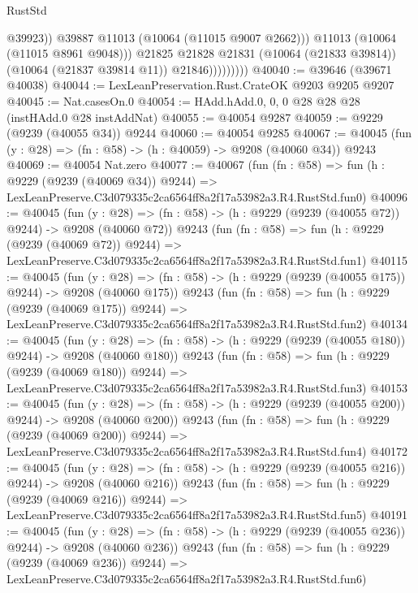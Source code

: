 \begin{lexlean}{RustStd}
\begin{coremodule}
                              @39923))
                          @39887
                          @11013
                          (@10064 (@11015 @9007 @2662)))
                        @11013
                        (@10064 (@11015 @8961 @9048)))
                      @21825
                      @21828
                      @21831
                      (@10064 (@21833 @39814))
                      (@10064 (@21837 @39814 @11))
                      @21846)))))))))
@40040 := @39646 (@39671 @40038)
@40044 := LexLeanPreservation.Rust.CrateOK @9203 @9205 @9207
@40045 := Nat.casesOn.{0}
@40054 := HAdd.hAdd.{0, 0, 0} @28 @28 @28 (instHAdd.{0} @28 instAddNat)
@40055 := @40054 @9287
@40059 := @9229 (@9239 (@40055 @34)) @9244
@40060 := @40054 @9285
@40067 := @40045 (fun (y : @28) => (fn : @58) -> (h : @40059) -> @9208 (@40060 @34)) @9243
@40069 := @40054 Nat.zero
@40077 := @40067
    (fun (fn : @58) =>
    fun (h : @9229 (@9239 (@40069 @34)) @9244) =>
    LexLeanPreserve.C3d079335c2ca6564ff8a2f17a53982a3.R4.RustStd.fun0)
@40096 := @40045
    (fun (y : @28) => (fn : @58) -> (h : @9229 (@9239 (@40055 @72)) @9244) -> @9208 (@40060 @72))
    @9243
    (fun (fn : @58) =>
    fun (h : @9229 (@9239 (@40069 @72)) @9244) =>
    LexLeanPreserve.C3d079335c2ca6564ff8a2f17a53982a3.R4.RustStd.fun1)
@40115 := @40045
    (fun (y : @28) => (fn : @58) -> (h : @9229 (@9239 (@40055 @175)) @9244) -> @9208 (@40060 @175))
    @9243
    (fun (fn : @58) =>
    fun (h : @9229 (@9239 (@40069 @175)) @9244) =>
    LexLeanPreserve.C3d079335c2ca6564ff8a2f17a53982a3.R4.RustStd.fun2)
@40134 := @40045
    (fun (y : @28) => (fn : @58) -> (h : @9229 (@9239 (@40055 @180)) @9244) -> @9208 (@40060 @180))
    @9243
    (fun (fn : @58) =>
    fun (h : @9229 (@9239 (@40069 @180)) @9244) =>
    LexLeanPreserve.C3d079335c2ca6564ff8a2f17a53982a3.R4.RustStd.fun3)
@40153 := @40045
    (fun (y : @28) => (fn : @58) -> (h : @9229 (@9239 (@40055 @200)) @9244) -> @9208 (@40060 @200))
    @9243
    (fun (fn : @58) =>
    fun (h : @9229 (@9239 (@40069 @200)) @9244) =>
    LexLeanPreserve.C3d079335c2ca6564ff8a2f17a53982a3.R4.RustStd.fun4)
@40172 := @40045
    (fun (y : @28) => (fn : @58) -> (h : @9229 (@9239 (@40055 @216)) @9244) -> @9208 (@40060 @216))
    @9243
    (fun (fn : @58) =>
    fun (h : @9229 (@9239 (@40069 @216)) @9244) =>
    LexLeanPreserve.C3d079335c2ca6564ff8a2f17a53982a3.R4.RustStd.fun5)
@40191 := @40045
    (fun (y : @28) => (fn : @58) -> (h : @9229 (@9239 (@40055 @236)) @9244) -> @9208 (@40060 @236))
    @9243
    (fun (fn : @58) =>
    fun (h : @9229 (@9239 (@40069 @236)) @9244) =>
    LexLeanPreserve.C3d079335c2ca6564ff8a2f17a53982a3.R4.RustStd.fun6)

\end{coremodule}
\end{lexlean}
